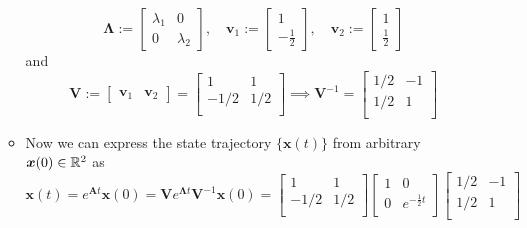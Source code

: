 \documentclass[12pt,a4paper]{article}
\begin{document}
\begin{itemize}
\begin{itemize}
\begin{equation}
      \bm{\Lambda}:=
      \begin{bmatrix}
       \lambda_{1} & 0\\
       0 & \lambda_{2}
      \end{bmatrix},
      \quad
      \bm{v}_{1} :=
      \begin{bmatrix}
        1 \\
        - \frac{1}{2}
      \end{bmatrix},
      \quad
      \bm{v}_{2} :=
      \begin{bmatrix}
        1 \\
        \frac{1}{2}
      \end{bmatrix}
    \end{equation}
    and
    \begin{equation}\nonumber%
      \bm{V}:=
      \begin{bmatrix}
        \bm{v}_{1} & \bm{v}_{2}
      \end{bmatrix}
      =
      \begin{bmatrix}
        1 & 1 \\
        -1/2 & 1/2 \\
      \end{bmatrix}
      \implies
      \bm{V}^{-1} =
      \begin{bmatrix}
        1/2 & -1 \\
        1/2 & 1 \\
      \end{bmatrix}
      \end{equation}
    \item Now we can express the state trajectory $\{\bm{x}(t)\}$ from arbitrary $\bm{x}(0)\in \mathbb{R}^{2}$ as
      \begin{equation}\nonumber%
        \bm{x}(t) =
        e^{\bm{A}t}\bm{x}(0)
        =
        \bm{V}e^{\bm{\Lambda}t}\bm{V}^{-1}\bm{x}(0)
        =
      \begin{bmatrix}
        1 & 1 \\
        -1/2 & 1/2 \\
      \end{bmatrix}
      \begin{bmatrix}
        1 & 0 \\
        0 & e^{-\frac{1}{2}t} \\
      \end{bmatrix}
      \begin{bmatrix}
        1/2 & -1 \\
        1/2 & 1 \\

\end{bmatrix}
\end{equation}
\end{itemize}
\end{itemize}
\end{document}
